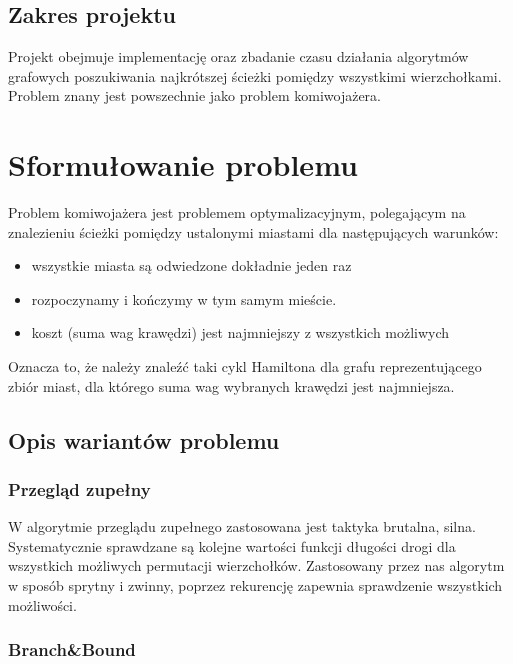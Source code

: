 \documentclass{article}
\begin{document}
	\subsection {Zakres projektu}
	Projekt obejmuje implementację oraz zbadanie czasu działania algorytmów grafowych poszukiwania najkrótszej ścieżki pomiędzy wszystkimi wierzchołkami. Problem znany jest powszechnie jako problem komiwojażera.
\section{Sformułowanie problemu}
		Problem komiwojażera jest problemem optymalizacyjnym, polegającym na znalezieniu ścieżki pomiędzy ustalonymi miastami dla następujących warunków: 
		\begin{itemize}
			\item wszystkie miasta są odwiedzone dokładnie jeden raz
			\item rozpoczynamy i kończymy w tym samym mieście.
			\item koszt (suma wag krawędzi) jest najmniejszy z wszystkich możliwych
		\end{itemize}
		Oznacza to, że należy znaleźć taki cykl Hamiltona dla grafu reprezentującego zbiór miast, dla którego suma wag wybranych krawędzi jest najmniejsza.
		
	\subsection{Opis wariantów problemu}	
		\subsubsection{Przegląd zupełny}
				W algorytmie przeglądu zupełnego zastosowana jest taktyka brutalna, silna. Systematycznie sprawdzane są kolejne wartości funkcji długości drogi dla wszystkich możliwych permutacji wierzchołków. Zastosowany przez nas algorytm w sposób sprytny i zwinny, poprzez rekurencję zapewnia sprawdzenie wszystkich możliwości.
		\subsubsection{Branch\&Bound}
			
\end{document}
